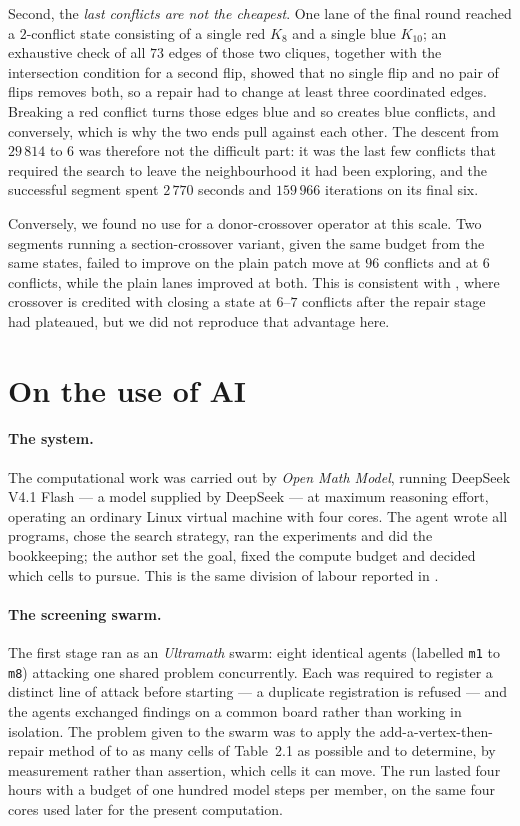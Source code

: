 \documentclass[11pt]{article}
\begin{document}
Second, the \emph{last conflicts are not the cheapest}. One lane of the final round reached a
$2$-conflict state consisting of a single red $K_8$ and a single blue $K_{10}$; an exhaustive check of
all $73$ edges of those two cliques, together with the intersection condition for a second flip,
showed that no single flip and no pair of flips removes both, so a repair had to change at least three
coordinated edges. Breaking a red conflict turns those edges blue and so creates blue conflicts, and
conversely, which is why the two ends pull against each other. The descent from $29\,814$ to $6$ was
therefore not the difficult part: it was the last few conflicts that required the search to leave the
neighbourhood it had been exploring, and the successful segment spent $2\,770$ seconds and
$159\,966$ iterations on its final six.

Conversely, we found no use for a donor-crossover operator at this scale. Two segments running a
section-crossover variant, given the same budget from the same states, failed to improve on the plain
patch move at $96$ conflicts and at $6$ conflicts, while the plain lanes improved at both. This is
consistent with \cite{cremer}, where crossover is credited with closing a state at $6$--$7$ conflicts
after the repair stage had plateaued, but we did not reproduce that advantage here.

\section{On the use of AI}\label{sec:ai}

\paragraph{The system.}
The computational work was carried out by \emph{Open Math Model}, running DeepSeek V4.1 Flash --- a
model supplied by DeepSeek --- at maximum reasoning effort, operating an ordinary Linux virtual
machine with four cores. The
agent wrote all programs, chose the search strategy, ran the experiments and did the bookkeeping; the author set the goal, fixed the compute budget and decided
which cells to pursue. This is the same division of labour reported in \cite{cremer}.

\paragraph{The screening swarm.}
The first stage ran as an \emph{Ultramath} swarm: eight identical agents (labelled \texttt{m1} to
\texttt{m8}) attacking one shared problem concurrently. Each was required to register a distinct line
of attack before starting --- a duplicate registration is refused --- and the agents exchanged
findings on a common board rather than working in isolation. The problem given to the swarm was to
apply the add-a-vertex-then-repair method of \cite{cremer} to as many cells of Table~2.1 as possible
and to determine, by measurement rather than assertion, which cells it can move. The run lasted four
hours with a budget of one hundred model steps per member, on the same four cores used later for the
present computation.
\end{document}
